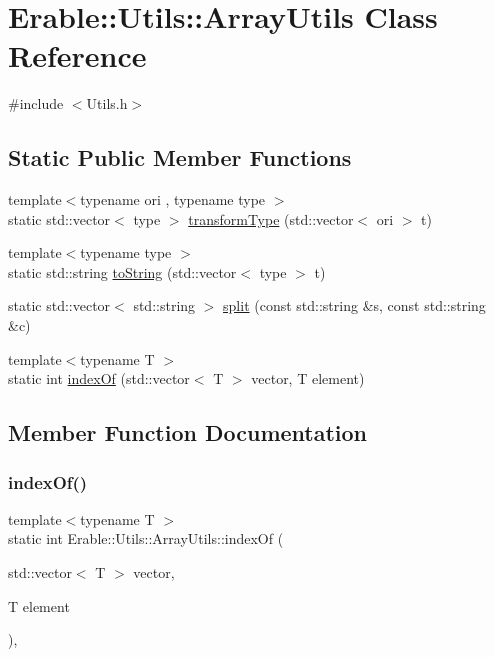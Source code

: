 \hypertarget{class_erable_1_1_utils_1_1_array_utils}{}\section{Erable\+::Utils\+::Array\+Utils Class Reference}
\label{class_erable_1_1_utils_1_1_array_utils}


{\ttfamily \#include $<$Utils.\+h$>$}

\subsection*{Static Public Member Functions}
\begin{DoxyCompactItemize}
\item 
{\footnotesize template$<$typename ori , typename type $>$ }\\static std\+::vector$<$ type $>$ \mbox{\hyperlink{class_erable_1_1_utils_1_1_array_utils_ade18152992f91c71633e2fdbaad9ac7d}{transform\+Type}} (std\+::vector$<$ ori $>$ t)
\item 
{\footnotesize template$<$typename type $>$ }\\static std\+::string \mbox{\hyperlink{class_erable_1_1_utils_1_1_array_utils_a0ee1760ed1a3f4e4607df01dcdfffa38}{to\+String}} (std\+::vector$<$ type $>$ t)
\item 
static std\+::vector$<$ std\+::string $>$ \mbox{\hyperlink{class_erable_1_1_utils_1_1_array_utils_a0480c779e520d62c2acec66d67a103e2}{split}} (const std\+::string \&s, const std\+::string \&c)
\item 
{\footnotesize template$<$typename T $>$ }\\static int \mbox{\hyperlink{class_erable_1_1_utils_1_1_array_utils_a5bea0db15ce55a33b232f47f13644949}{index\+Of}} (std\+::vector$<$ T $>$ vector, T element)
\end{DoxyCompactItemize}


\subsection{Member Function Documentation}
\mbox{\label{class_erable_1_1_utils_1_1_array_utils_a5bea0db15ce55a33b232f47f13644949}} 
\subsubsection{\texorpdfstring{indexOf()}{indexOf()}}
{\footnotesize\ttfamily template$<$typename T $>$ \\
static int Erable\+::\+Utils\+::\+Array\+Utils\+::index\+Of (\begin{DoxyParamCaption}\item[{std\+::vector$<$ T $>$}]{vector,  }\item[{T}]{element }\end{DoxyParamCaption})\hspace{0.3cm}{\ttfamily [inline]}, {\ttfamily [static]}}

